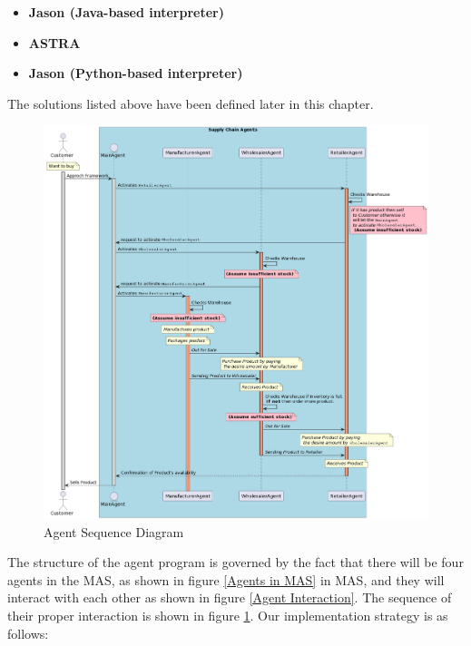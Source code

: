 \begin{itemize}
    \item \textbf{Jason (Java-based interpreter)}
    \vspace{.3cm }
    \item \textbf{ASTRA}
    \vspace{.3cm }
    \item \textbf{Jason (Python-based interpreter)}

\end{itemize}

The solutions listed above have been defined later in this chapter.

\vspace{.5cm }

\begin{figure}[h]
\centering
  \includegraphics[width=13cm]{includes/figures/agentsequence.png} 
  \caption{Agent Sequence Diagram}
  \label{agentsequence}
\end{figure}

\vspace{.5cm }

The structure of the agent program is governed by the fact that there will be four agents in the \ac{MAS}, as shown in figure \ref{Agents in MAS} in MAS, and they will interact with each other as shown in figure \ref{Agent Interaction}. The sequence of their proper interaction is shown in figure \ref{agentsequence}. Our implementation strategy is as follows:

